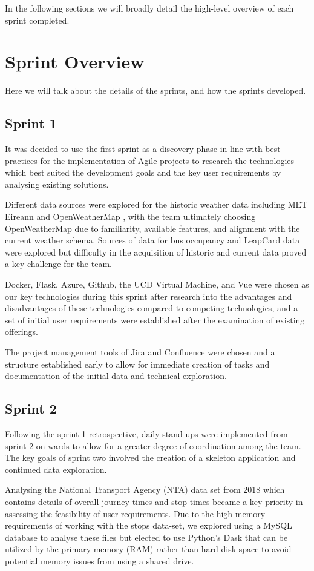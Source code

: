 \documentclass[]{UCD_CS_47360_Report}
\begin{document}
In the following sections we will broadly detail the high-level overview of each sprint completed.

\section{Sprint Overview}
Here we will talk about the details of the sprints, and how the sprints developed.

\subsection{Sprint 1}

It was decided to use the first sprint as a discovery phase in-line with best practices for the implementation of Agile projects \cite{GOV} to research the technologies which best suited the development goals and the key user requirements by analysing existing solutions. 

Different data sources were explored for the historic weather data including MET Eireann \cite{MET} and OpenWeatherMap \cite{OpenWeatherMap}, with the team ultimately choosing OpenWeatherMap due to familiarity, available features, and alignment with the current weather schema. Sources of data for bus occupancy and LeapCard data were explored but difficulty in the acquisition of historic and current data proved a key challenge for the team.

Docker, Flask, Azure, Github, the UCD Virtual Machine, and Vue were chosen as our key technologies during this sprint after research into the advantages and disadvantages of these technologies compared to competing technologies, and a set of initial user requirements were established after the examination of existing offerings.

The project management tools of Jira and Confluence were chosen and a structure established early to allow for immediate creation of tasks and documentation of the initial data and technical exploration.

\subsection{Sprint 2}
Following the sprint 1 retrospective, daily stand-ups were implemented from sprint 2 on-wards to allow for a greater degree of coordination among the team. The key goals of sprint two involved the creation of a skeleton application and continued data exploration.

Analysing the National Transport Agency (NTA) data set from 2018 which contains details of overall journey times and stop times became a key priority in assessing the feasibility of user requirements. Due to the high memory requirements of working with the stops data-set, we explored using a MySQL database to analyse these files but elected to use Python's Dask that can be utilized by the primary memory (RAM) rather than hard-disk space to avoid potential memory issues from using a shared drive.
\end{document}
